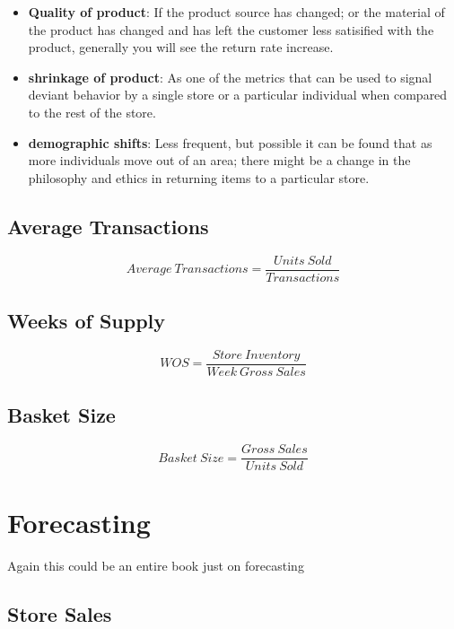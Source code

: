 \documentclass[]{book}
\providecommand{\tightlist}{%
  \setlength{\itemsep}{0pt}\setlength{\parskip}{0pt}}
\theoremstyle{definition}
\theoremstyle{definition}
\theoremstyle{definition}
\theoremstyle{remark}
\begin{document}
\begin{itemize}
\tightlist
\item
  \textbf{Quality of product}: If the product source has changed; or the
  material of the product has changed and has left the customer less
  satisified with the product, generally you will see the return rate
  increase.
\item
  \textbf{shrinkage of product}: As one of the metrics that can be used
  to signal deviant behavior by a single store or a particular
  individual when compared to the rest of the store.
\item
  \textbf{demographic shifts}: Less frequent, but possible it can be
  found that as more individuals move out of an area; there might be a
  change in the philosophy and ethics in returning items to a particular
  store.
\end{itemize}

\hypertarget{average-transactions}{%
\section{Average Transactions}\label{average-transactions}}

\[
Average\ Transactions = \frac{Units\ Sold}{Transactions}
\]

\hypertarget{weeks-of-supply}{%
\section{Weeks of Supply}\label{weeks-of-supply}}

\[
WOS = \frac{Store\ Inventory}{Week\ Gross\ Sales}
\]

\hypertarget{basket-size}{%
\section{Basket Size}\label{basket-size}}

\[
Basket\ Size = \frac{Gross\ Sales}{Units\ Sold}
\]

\hypertarget{forecasting}{%
\chapter{Forecasting}\label{forecasting}}

Again this could be an entire book just on forecasting

\hypertarget{store-sales}{%
\section{Store Sales}\label{store-sales}}
\end{document}
